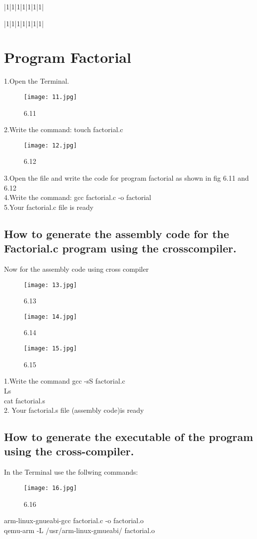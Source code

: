 \documentclass[a4paper,12pt]{article}
\begin{document}
\begin{tabular}{|1|1|1|1|1|1|1|}
\begin{tabular}{|1|1|1|1|1|1|1|}
\end{tabular}

\section{Program Factorial}
1.Open the Terminal.\\
\newpage
\begin{figure}[h]
	\texttt{[image: 11.jpg]}
	\caption{ 6.11}
\end{figure}
2.Write the command: touch  factorial.c \\

\begin{figure}[h]
	\texttt{[image: 12.jpg]}
	\caption{ 6.12}
\end{figure}
3.Open the file and write the code for program factorial as shown in fig 6.11 and 6.12\\
4.Write the command: gcc factorial.c -o factorial\\
5.Your factorial.c file is ready\\

\subsection{ How to generate the assembly code for the Factorial.c program using the crosscompiler. }
Now for the assembly code using cross compiler\\
\begin{figure}[h]
	\texttt{[image: 13.jpg]}
	\caption{ 6.13}
\end{figure}
\begin{figure}[h]
	\texttt{[image: 14.jpg]}
	\caption{ 6.14}
\end{figure}
\begin{figure}[h]
	\texttt{[image: 15.jpg]}
	\caption{ 6.15}
\end{figure}
1.Write the command gcc -sS factorial.c \\
Ls\\
cat factorial.s\\
2. Your factorial.s file (assembly code)is ready
\newpage
\subsection{How to generate the executable of the program using the cross-compiler. }
In the Terminal 
use the follwing commands: \\
\begin{figure}[h]
	\texttt{[image: 16.jpg]}
	\caption{ 6.16}
\end{figure}
arm-linux-gnueabi-gcc factorial.c -o factorial.o\\
qemu-arm -L /usr/arm-linux-gmueabi/ factorial.o

\end{tabular}
\end{document}
